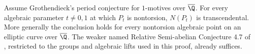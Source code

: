 \begin{proposition}\label{ari:C.7.4}
Assume Grothendieck's period conjecture for $1$-motives over
$\overline\Q$. For every algebraic parameter $t\ne0,1$ at
which $P_t$ is nontorsion, $N(P_t)$ is transcendental.
More generally the conclusion holds for every nontorsion
algebraic point on an elliptic curve over $\overline\Q$.
The weaker named Relative Semi-abelian Conjecture 4.7 of
\citet{bertolin2022}, restricted to the groups and algebraic
lifts used in this proof, already suffices.
\end{proposition}

